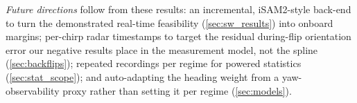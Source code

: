 \emph{Future directions} follow from these results: an incremental,
iSAM2-style back-end to turn the demonstrated real-time feasibility
(\autoref{sec:sw_results}) into onboard margins; per-chirp radar timestamps
to target the residual during-flip orientation error our negative results
place in the measurement model, not the spline (\autoref{sec:backflips});
repeated recordings per regime for powered statistics
(\autoref{sec:stat_scope}); and auto-adapting the heading weight from a
yaw-observability proxy rather than setting it per regime
(\autoref{sec:models}).

